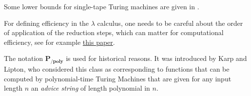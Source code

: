 Some lower bounds for single-tape Turing machines are given in
\cite{maass1985combinatorial}.

For defining efficiency in the \(\lambda\) calculus, one needs to be
careful about the order of application of the reduction steps, which can
matter for computational efficiency, see for example
\href{https://lmcs.episciences.org/1627}{this paper}.

The notation \(\mathbf{P_{/poly}}\) is used for historical reasons. It
was introduced by Karp and Lipton, who considered this class as
corresponding to functions that can be computed by polynomial-time
Turing Machines that are given for any input length \(n\) an
\emph{advice string} of length polynomial in \(n\).
